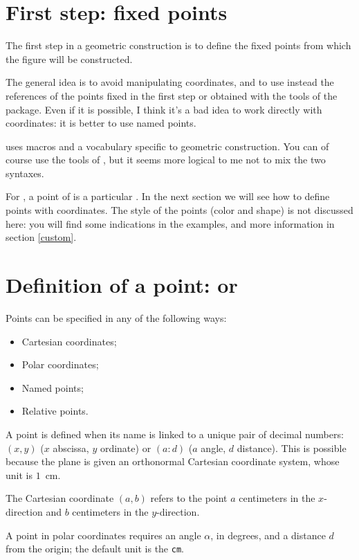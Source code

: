\section{First step: fixed points}

The first step in a geometric construction is to define the fixed points from which the figure will be constructed.

The general idea is to avoid manipulating coordinates, and to use instead the references of the points fixed in the first step or obtained with the tools of the package. Even if it is possible, I think it's a bad idea to work directly with coordinates: it is better to use named points.

\tkzname{\tkznameofpack} uses macros and a vocabulary specific to geometric construction. You can of course use the tools of \TIKZ, but it seems more logical to me not to mix the two syntaxes.

For \TIKZ, a point of \tkzname{\tkznameofpack} is a particular . In the next section we will see how to define points with coordinates. The style of the points (color and shape) is not discussed here: you will find some indications in the examples, and more information in section \ref{custom}.


\section{Definition of a point:  or }

 Points can be specified in any of the following ways:
\begin{itemize}
\item Cartesian coordinates;
\item Polar coordinates;
\item Named points;
\item Relative points.
\end{itemize}


A point is defined when its name is linked to a unique pair of decimal numbers:
 $(x,y)$ ($x$ abscissa, $y$ ordinate) or $(a:d)$ ($a$ angle, $d$ distance).
 This is possible because the plane is given an orthonormal Cartesian coordinate system, whose unit is $1$~cm.
 
 The Cartesian coordinate $(a,b)$ refers to the
 point $a$ centimeters in the $x$-direction and $b$ centimeters in the
 $y$-direction.

 A point in polar coordinates requires an angle $\alpha$, in degrees,
 and a distance $d$ from the origin; the default unit
 is the \texttt{cm}.
 
